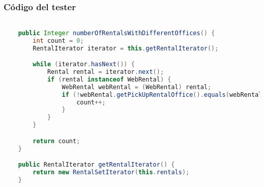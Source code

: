 \subsubsection*{Código del tester}

\begin{lstlisting}[style = javaNormal, language=Java] 

    public Integer numberOfRentalsWithDifferentOffices() {
        int count = 0;
        RentalIterator iterator = this.getRentalIterator();

        while (iterator.hasNext()) {
            Rental rental = iterator.next();
            if (rental instanceof WebRental) {
                WebRental webRental = (WebRental) rental;
                if (!webRental.getPickUpRentalOffice().equals(webRental.getDeliveryRentalOffice())) {
                    count++;
                }
            }
        }

        return count;
    }

    public RentalIterator getRentalIterator() {
        return new RentalSetIterator(this.rentals);
    }

\end{lstlisting}
\vspace{1cm}
